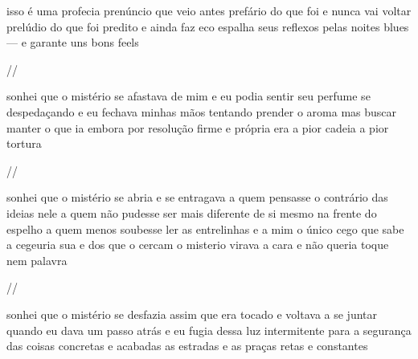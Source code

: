\begin{poem}
\begin{stanza}
isso é uma profecia\verseline
prenúncio que veio\verseline
antes\verseline
prefário do que foi\verseline
e nunca vai voltar\verseline
prelúdio do que foi predito\verseline
e ainda faz eco\verseline
\qquad espalha\verseline
\qquad seus reflexos\verseline
\qquad pelas noites blues\verseline
\qquad \qquad --- e garante uns bons feels
\end{stanza}
\begin{stanza}
//
\end{stanza}
\begin{stanza}
sonhei que o mistério\verseline
se afastava de mim\verseline
e eu podia sentir\verseline
\qquad seu perfume\verseline
\qquad \qquad se despedaçando\verseline
e eu fechava minhas mãos\verseline
tentando prender o aroma\verseline
\qquad mas buscar manter\verseline
\qquad o que ia embora\verseline
\qquad por resolução firme e própria\verseline
\qquad \qquad era a pior cadeia\verseline
\qquad \qquad \quad a pior tortura
\end{stanza}
\begin{stanza}
//
\end{stanza}
\begin{stanza}
sonhei que o mistério\verseline
se abria\verseline
e se entragava a quem\verseline
pensasse o contrário\verseline
das ideias nele\verseline
\qquad \qquad a quem\verseline
não pudesse ser mais diferente\verseline
de si mesmo na frente do espelho\verseline
a quem menos soubesse ler\verseline
as entrelinhas\verseline
\qquad e a mim\verseline
\qquad \quad o único cego que sabe\verseline
\qquad \quad a cegeuria\verseline
\qquad \quad sua e dos que o cercam\verseline
\qquad o misterio virava a cara\verseline
\qquad e não queria toque\verseline
\qquad nem palavra
\end{stanza}
\begin{stanza}
//
\end{stanza}
\begin{stanza}
sonhei que o mistério se desfazia\verseline
assim que era tocado\verseline
e voltava a se juntar\verseline
quando eu dava um passo\verseline
\hspace{-1em} atrás\verseline
e eu fugia dessa luz\verseline
intermitente\verseline
para a segurança das coisas\verseline
concretas e acabadas\verseline
\hspace{-1em}as estradas e as praças\verseline
\hspace{-1em}retas e constantes
\end{stanza}
\end{poem}